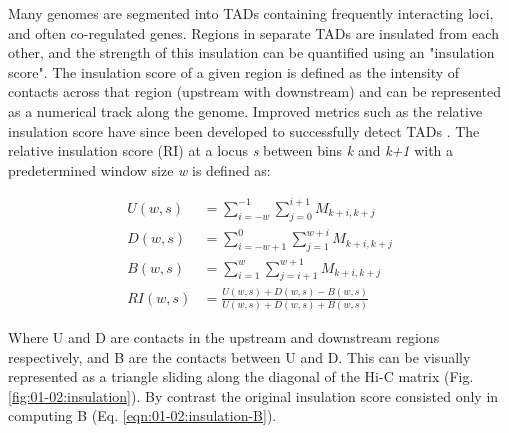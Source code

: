 Many genomes are segmented into \acrshort{TAD}s containing frequently interacting loci, and often co-regulated genes. Regions in separate \acrshort{TAD}s are insulated from each other, and the strength of this insulation can be quantified using an "insulation score". The insulation score of a given region is defined as the intensity of contacts across that region (upstream with downstream) \cite{craneCondensindrivenRemodellingChromosome2015} and can be represented as a numerical track along the genome. Improved metrics such as the relative insulation score have since been developed to successfully detect \acrshort{TAD}s \cite{chenHiCDBSensitiveRobust2018}. The relative insulation score (RI) at a locus \textit{s} between bins \textit{k} and \textit{k+1} with a predetermined window size \textit{w} is defined as:

\begin{align}
    \label{eqn:01-02:insulation-U}
    U(w, s) &= \sum_{i=-w}^{-1}{\sum_{j=0}^{i+1}{M_{k+i,k+j}}} \\
    \label{eqn:01-02:insulation-D}
    D(w, s) &= \sum_{i=-w+1}^{0}{\sum_{j=1}^{w+i}{M_{k+i,k+j}}} \\
    \label{eqn:01-02:insulation-B}
    B(w, s) &= \sum_{i=1}^{w}{\sum_{j=i+1}^{w+1}{M_{k+i,k+j}}} \\
    \label{eqn:01-02:insulation-RI}
    RI(w, s) &= \frac{U(w, s) + D(w, s) - B(w, s)}{U(w, s) + D(w, s) + B(w, s)}
\end{align}

Where U and D are contacts in the upstream and downstream regions respectively, and B are the contacts between U and D. This can be visually represented as a triangle sliding along the diagonal of the Hi-C matrix (Fig. \ref{fig:01-02:insulation}). By contrast the original insulation score consisted only in computing B (Eq. \ref{eqn:01-02:insulation-B}).

